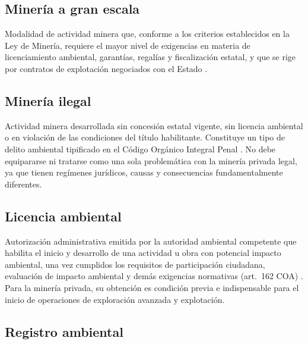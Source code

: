 \subsection{Minería a gran escala}

Modalidad de actividad minera que, conforme a los criterios establecidos en la Ley de Minería, requiere el mayor nivel de exigencias en materia de licenciamiento ambiental, garantías, regalías y fiscalización estatal, y que se rige por contratos de explotación negociados con el Estado \parencite{ley_mineria_2025}.

\subsection{Minería ilegal}

Actividad minera desarrollada sin concesión estatal vigente, sin licencia ambiental o en violación de las condiciones del título habilitante. Constituye un tipo de delito ambiental tipificado en el Código Orgánico Integral Penal \parencite{coip_2014}. No debe equipararse ni tratarse como una sola problemática con la minería privada legal, ya que tienen regímenes jurídicos, causas y consecuencias fundamentalmente diferentes.

\subsection{Licencia ambiental}

Autorización administrativa emitida por la autoridad ambiental competente que habilita el inicio y desarrollo de una actividad u obra con potencial impacto ambiental, una vez cumplidos los requisitos de participación ciudadana, evaluación de impacto ambiental y demás exigencias normativas (art.\ 162 COA) \parencite{coa_2017}. Para la minería privada, su obtención es condición previa e indispensable para el inicio de operaciones de exploración avanzada y explotación.

\subsection{Registro ambiental}

